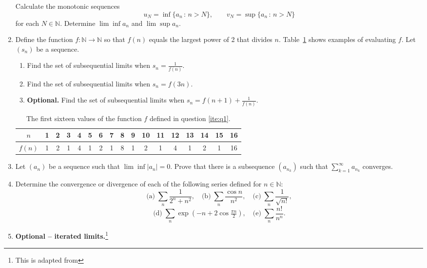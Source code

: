 \documentclass[12pt]{article}
\newcommand{\N}{\mathbb{N}}
\newcommand{\sep}{\,:\,}
\begin{document}
\begin{enumerate}
    Calculate the monotonic sequences
    \begin{equation}
      u_N = \inf\{a_n \sep n>N\}, \qquad v_N = \sup\{a_n \sep n>N\}
    \end{equation}
    for each $N\in \N$. Determine $\lim \inf a_n$ and $\lim \sup a_n$.
  \item \label{ite:q1}Define the function $f: \N \to \N$ so that $f(n)$ equals the largest
    power of 2 that divides $n$. Table~\ref{tbl:fofn} shows examples of
    evaluating $f$. Let $(s_n)$ be a sequence.
    \begin{enumerate}
      \item Find the set of subsequential limits when $s_n=\tfrac{1}{f(n)}$.
      \item Find the set of subsequential limits when $s_n=f(3n)$.
      \item \textbf{Optional.} Find the set of subsequential limits when $s_n =
        f(n+1) + \tfrac{1}{f(n)}$.
    \end{enumerate}
    \begin{table}[b]
      \begin{center}
        \begin{tabular}{|c|c|c|c|c|c|c|c|c|c|c|c|c|c|c|c|c|}
          \hline
          $n$ & 1 & 2 & 3 & 4 & 5 & 6 & 7 & 8 & 9 & 10 & 11 & 12 & 13 & 14 & 15 & 16 \\
          \hline
          $f(n)$ & 1 & 2 & 1 & 4 & 1 & 2 & 1 & 8 & 1 & 2 & 1 & 4 & 1 & 2 & 1 & 16 \\
          \hline
        \end{tabular}
      \end{center}
      \caption{The first sixteen values of the function $f$ defined in question
      \ref{ite:q1}.\label{tbl:fofn}}
    \end{table}
  \item Let $(a_n)$ be a sequence such that $\lim \inf |a_n|=0$. Prove that
    there is a subsequence $(a_{n_k})$ such that $\sum_{k=1}^\infty a_{n_k}$
    converges.
  \item Determine the convergence or divergence of each of the following
    series defined for $n\in \N$:
    \[
      \textrm{(a)}\;\sum_n \frac{1}{2^n+n^2}, \quad
      \textrm{(b)}\;\sum_n \frac{\cos n}{n^2}, \quad
      \textrm{(c)}\;\sum_n \frac{1}{\sqrt{n!}},
    \]
    \[
      \textrm{(d)}\;\sum_n \exp\left(-n+2\cos \tfrac{\pi n}{2} \right), \quad
      \textrm{(e)}\;\sum_n \frac{n!}{n^n}.
    \]    
  \item \textbf{Optional -- iterated limits.}\footnote{This is adapted from
}
\end{enumerate}
\end{document}

